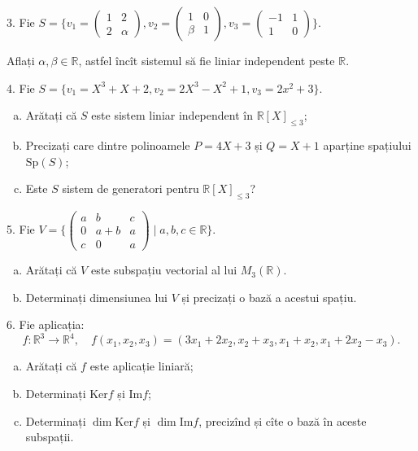 \documentclass[11pt,a4paper]{article}
\newcommand\RR{\mathbb{R}}
\theoremstyle{dotless}
\theoremstyle{dotlessdr}
\begin{document}
\vspace{1cm}

3. Fie $S = \Bigg\{ v_1 = \begin{pmatrix} 1 & 2 \\ 2 & \alpha \end{pmatrix}, %
v_2 = \begin{pmatrix} 1 & 0 \\ \beta & 1 \end{pmatrix}, %
v_3 = \begin{pmatrix} -1 & 1 \\ 1 & 0 \end{pmatrix} \Bigg\}$.

Aflați $\alpha, \beta \in \RR$, astfel încît sistemul să fie liniar independent peste $\RR$.

\vspace{1cm}

4. Fie $S = \{ v_1 = X^3 + X + 2, v_2 = 2X^3 - X^2 + 1, v_3 = 2x^2 + 3 \}$.
\begin{enumerate}[(a)]
\item Arătați că $S$ este sistem liniar independent în $\RR[X]_{\leq 3}$;
\item Precizați care dintre polinoamele $P = 4X + 3$ și $Q = X + 1$ aparține spațiului $\mathrm{Sp}(S)$;
\item Este $S$ sistem de generatori pentru $\RR[X]_{\leq 3}$?
\end{enumerate}

\vspace{1cm}

5. Fie $V = \Bigg\{
\begin{pmatrix}
  a & b & c \\
  0 & a + b & a \\
  c & 0 & a
\end{pmatrix} \mid a, b, c \in \RR \Bigg\}$.

\begin{enumerate}[(a)]
\item Arătați că $V$ este subspațiu vectorial al lui $M_3(\RR)$.
\item Determinați dimensiunea lui $V$ și precizați o bază a acestui spațiu.
\end{enumerate}

\vspace{1cm}

6. Fie aplicația:
\[
  f : \RR^3 \to \RR^4, \quad f(x_1, x_2, x_3) = (3x_1 + 2x_2, x_2 + x_3, x_1 + x_2, x_1 + 2x_2 - x_3).
\]
\begin{enumerate}[(a)]
\item Arătați că $f$ este aplicație liniară;
\item Determinați $\mathrm{Ker}f$ și $\mathrm{Im}f$;
\item Determinați $\dim \mathrm{Ker} f$ și $\dim \mathrm{Im} f$, precizînd și cîte o
  bază în aceste subspații.
\end{enumerate}
\end{document}
